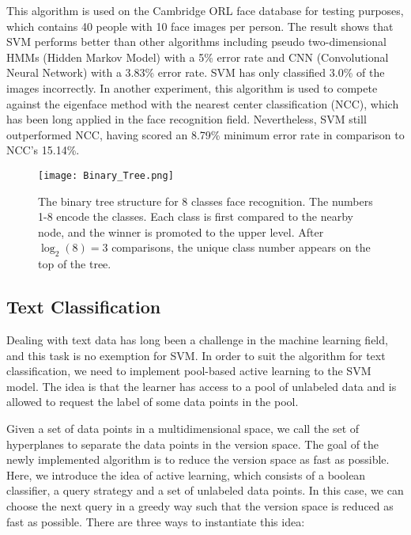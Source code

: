 This algorithm is used on the Cambridge ORL face database for testing purposes, 
which contains 40 people with 10 face images per person.
The result shows that SVM performs better than other algorithms including
pseudo two-dimensional HMMs (Hidden Markov Model) with a 5\% error rate 
and CNN (Convolutional Neural Network) with a 3.83\% error rate. SVM has
only classified 3.0\% of the images incorrectly. In another experiment,
this algorithm is used to compete against the eigenface method
with the nearest center classification (NCC), which has been long applied
in the face recognition field. Nevertheless, SVM still outperformed NCC,
having scored an 8.79\% minimum error rate in comparison to NCC's 15.14\%.
\cite{face-recognition}
\begin{figure}[h]%
    \begin{center}%
        \texttt{[image: Binary\_Tree.png]}%
        \caption{The binary tree structure for 8 classes face recognition.
        The numbers 1-8 encode the classes. 
        Each class is first compared to the nearby node,
        and the winner is promoted to the upper level.
        After $\log_2(8) = 3$ comparisons,
        the unique class number appears 
        on the top of the tree.
         \cite{face-recognition}}\label{fig:}%
    \end{center}%
\end{figure}

\subsection*{Text Classification}
Dealing with text data has long been a challenge in the machine learning
field, and this task is no exemption for SVM. In order to suit the algorithm
for text classification, we need to implement pool-based active learning
to the SVM model. The idea is that the learner has access to a pool of
unlabeled data and is allowed to request the label of some data points
in the pool.

Given a set of data points in a multidimensional space, we call the set
of hyperplanes to separate the data points in the version space. The goal of
the newly implemented algorithm is to reduce the version space as fast as
possible. Here, we introduce the idea of active learning, which consists of
a boolean classifier, a query strategy and a set of unlabeled data points.
In this case, we can choose the next query in a greedy way such that 
the version space is reduced as fast as possible. There are three ways
to instantiate this idea: 


